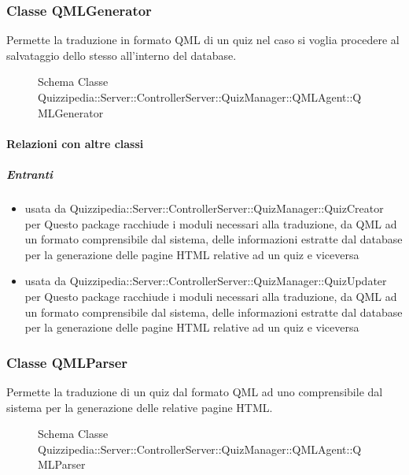 \subsubsection{Classe QMLGenerator}
Permette la traduzione in formato QML di un quiz nel caso si voglia procedere al salvataggio dello stesso all'interno del database.
\begin{figure}[H]
\centering
\noindent{}
\caption[Schema Classe QMLGenerator]{Schema Classe Quizzipedia::Server::ControllerServer::QuizManager::QMLAgent::QMLGenerator}
\end{figure}
\paragraph{Relazioni con altre classi}
\subparagraph{Entranti}
\begin{itemize}
\item usata da Quizzipedia::Server::ControllerServer::QuizManager::QuizCreator per Questo package racchiude i moduli necessari alla traduzione, da QML ad un formato comprensibile dal sistema, delle informazioni estratte dal database per la generazione delle pagine HTML relative ad un quiz e viceversa
\item usata da Quizzipedia::Server::ControllerServer::QuizManager::QuizUpdater per Questo package racchiude i moduli necessari alla traduzione, da QML ad un formato comprensibile dal sistema, delle informazioni estratte dal database per la generazione delle pagine HTML relative ad un quiz e viceversa
\end{itemize}
\subsubsection{Classe QMLParser}
Permette la traduzione di un quiz dal formato QML ad uno comprensibile dal sistema per la generazione delle relative pagine HTML.
\begin{figure}[H]
\centering
\noindent{}
\caption[Schema Classe QMLParser]{Schema Classe Quizzipedia::Server::ControllerServer::QuizManager::QMLAgent::QMLParser}
\end{figure}
